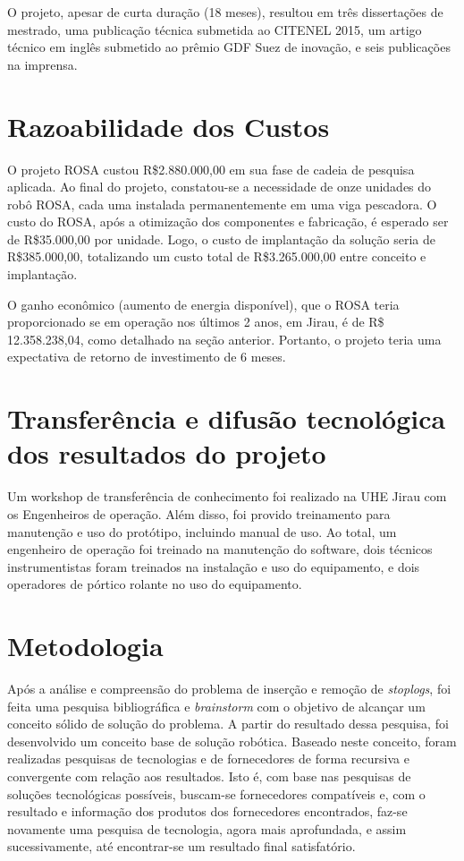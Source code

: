 O projeto, apesar de curta duração (18 meses), resultou em três dissertações de 
mestrado, uma publicação técnica submetida ao CITENEL 2015, um artigo técnico 
em inglês submetido ao prêmio GDF Suez de inovação, e seis publicações na
imprensa.

 
     
\section{Razoabilidade dos Custos}
O projeto ROSA custou R\$2.880.000,00 em sua fase de cadeia de pesquisa
aplicada. Ao final do projeto, constatou-se a necessidade de onze unidades 
do robô ROSA, cada uma instalada permanentemente em uma viga pescadora. O custo
do ROSA, após a otimização dos componentes e fabricação, é esperado ser de
R\$35.000,00 por unidade. Logo, o custo de implantação da solução seria de R\$385.000,00,
totalizando um custo total de R\$3.265.000,00 entre conceito e implantação.

O ganho econômico (aumento de energia disponível), que o ROSA teria
proporcionado se em operação nos últimos 2 anos, em Jirau, é de R\$
12.358.238,04, como detalhado na seção anterior. Portanto, o projeto teria uma
expectativa de retorno de investimento de 6 meses.

\section{Transferência e difusão tecnológica dos resultados do projeto}
Um workshop de transferência de conhecimento foi realizado na UHE Jirau com os
Engenheiros de operação. Além disso, foi provido treinamento para manutenção e
uso do protótipo, incluindo manual de uso. Ao total, um engenheiro de operação foi 
treinado na manutenção do software, dois técnicos instrumentistas foram treinados 
na instalação e uso do equipamento, e dois operadores de pórtico rolante no uso 
do equipamento.

\section{Metodologia}

Após a análise e compreensão do problema de inserção e remoção de
\textit{stoplogs}, foi feita uma pesquisa bibliográfica e \textit{brainstorm}
com o objetivo de alcançar um conceito sólido de solução do problema. A partir
do resultado dessa pesquisa, foi desenvolvido um conceito base de solução robótica. 
Baseado neste conceito, foram realizadas pesquisas de tecnologias e de fornecedores 
de forma recursiva e convergente com relação aos resultados. Isto é, com base
nas pesquisas de soluções tecnológicas possíveis, buscam-se fornecedores
compatíveis e, com o resultado e informação dos produtos dos fornecedores
encontrados, faz-se novamente uma pesquisa de tecnologia, agora mais
aprofundada, e assim sucessivamente, até encontrar-se um resultado final
satisfatório.

